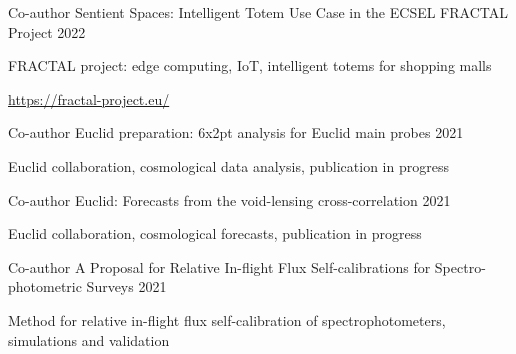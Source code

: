 \begin{cventries}
{{\begin{cvitems}
  \end{cvitems}
  }
}{%
  \cventry
  {Co-author} %
  {Sentient Spaces: Intelligent Totem Use Case in the ECSEL FRACTAL Project} %
  {2022} %
  { %
  \begin{cvitems}
    \item {FRACTAL project: edge computing, IoT, intelligent totems for shopping malls}
    \item {\url{https://fractal-project.eu/}}
  \end{cvitems}
  }
  \cventry
  {Co-author} %
  {Euclid preparation: 6x2pt analysis for Euclid main probes} %
  {2021} %
  { %
  \begin{cvitems}
    \item {Euclid collaboration, cosmological data analysis, publication in progress}
  \end{cvitems}
  }
  \cventry
  {Co-author} %
  {Euclid: Forecasts from the void-lensing cross-correlation} %
  {2021} %
  { %
  \begin{cvitems}
    \item {Euclid collaboration, cosmological forecasts, publication in progress}
  \end{cvitems}
  }
  \cventry
  {Co-author} %
  {A Proposal for Relative In-flight Flux Self-calibrations for Spectro-photometric Surveys} %
  {2021} %
  { %
  \begin{cvitems}
    \item {Method for relative in-flight flux self-calibration of spectrophotometers, simulations and validation}
  \end{cvitems}
  }
}

\end{cventries}
